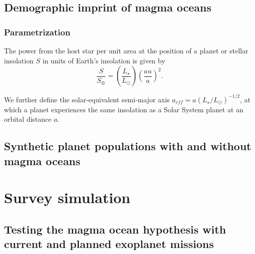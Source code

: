 \documentclass[twocolumn]{aastex631}
\begin{document}
\subsection{Demographic imprint of magma oceans}

\subsubsection{Parametrization}
\label{sec:mo_model}

\begin{note}
The power from the host star per unit area at the position of a planet or stellar insolation $S$ in units of Earth's insolation is given by
    \begin{equation}
        \frac{S}{S_\oplus} = \left(\frac{L_\star}{L_\odot}\right) \left(\frac{au}{a}\right)^2 .
    \end{equation}

We further define the solar-equivalent semi-major axis $a_{eff} = a (L_\star/L_\odot)^{-1/2}$, at which a planet experiences the same insolation as a Solar System planet at an orbital distance $a$.
\end{note}

\subsection{Synthetic planet populations with and without magma oceans}


\section{Survey simulation}

\subsection{Testing the magma ocean hypothesis with current and planned exoplanet missions}
\end{document}
